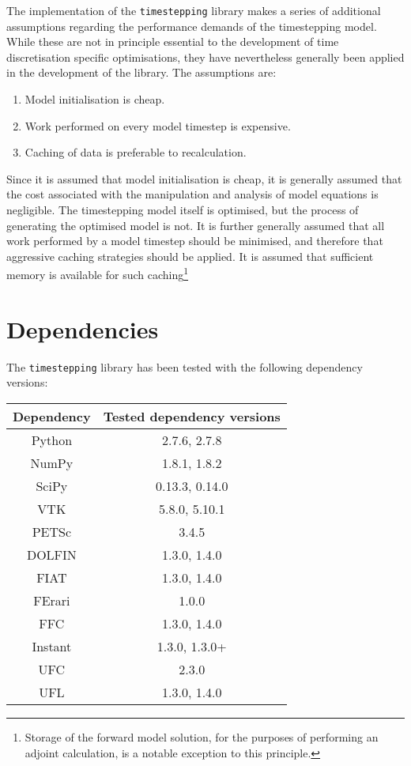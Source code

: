 \documentclass[a4paper]{book}
\begin{document}
The implementation of the \verb+timestepping+ library makes a series of
additional assumptions regarding the performance demands of the timestepping
model. While these are not in principle essential to the development of time
discretisation specific optimisations, they have nevertheless generally been
applied in the development of the library. The assumptions are:
\begin{enumerate}
  \item Model initialisation is cheap.
  \item Work performed on every model timestep is expensive.
  \item Caching of data is preferable to recalculation.
\end{enumerate}
Since it is assumed that model initialisation is cheap, it is generally assumed
that the cost associated with the manipulation and analysis of model equations
is negligible. The timestepping model itself is optimised, but the process of
generating the optimised model is not. It is further generally assumed that
all work performed by a model timestep should be minimised, and therefore
that aggressive caching strategies should be applied. It is assumed that
sufficient memory is available for such caching\footnote{Storage of the forward
model solution, for the purposes of performing an adjoint calculation, is a
notable exception to this principle.}

\section{Dependencies}

The \verb+timestepping+ library has been tested with the following dependency
versions:

\begin{center}
\begin{tabular}{| c | c | }
\hline
Dependency  & Tested dependency versions \\
\hline
Python  & 2.7.6, 2.7.8 \\
\hline
NumPy  & 1.8.1, 1.8.2 \\
SciPy  & 0.13.3, 0.14.0 \\
VTK    & 5.8.0, 5.10.1 \\
PETSc  & 3.4.5 \\
\hline
DOLFIN   & 1.3.0, 1.4.0 \\
FIAT     & 1.3.0, 1.4.0 \\
FErari   & 1.0.0 \\
FFC      & 1.3.0, 1.4.0 \\
Instant  & 1.3.0, 1.3.0+ \\
UFC      & 2.3.0 \\
UFL      & 1.3.0, 1.4.0 \\
\hline
\end{tabular}
\end{center}
\end{document}
